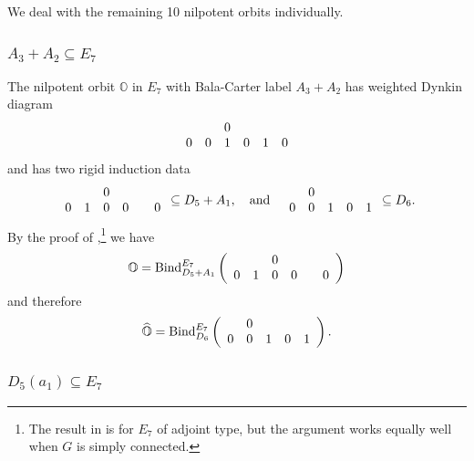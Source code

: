 \documentclass[11pt]{amsart}
\renewcommand{\O}{{\mathbb O}}
\newcommand{\BInd}{{{\mbox{\rm Bind}}}}
\newcommand{\hatO}{\widehat{\O}}
\numberwithin{equation}{section}
\begin{document}
	We deal with the remaining 10 nilpotent orbits individually.
	
	\subsubsection{\texorpdfstring{$A_3+A_2\subseteq E_7$}{A3A2 in E7}}\label{sss: A3A2 in E7}
	
	The nilpotent orbit $\O$ in $E_7$ with Bala-Carter label $A_3+A_2$ has weighted Dynkin diagram
	$$\begin{array}{c c c c c c}
		& & 0 & & & \\
		0 & 0 & 1 & 0 & 1 & 0 \\
	\end{array}$$ and has two rigid induction data $$\begin{array}{c c c c c c}
		& & 0 & & & \\
		0 & 1 & 0 & 0 & & 0  \\
	\end{array}\subseteq D_5+A_1,\quad\mbox{and}\quad \begin{array}{c c c c c}
		& 0 &  & &\\
		0 & 0 & 1 & 0 & 1\\
	\end{array}\subseteq D_6.$$
	By the proof of \cite[Proposition 3.1]{Fu},\footnote{The result in \cite{Fu} is for $E_7$ of adjoint type, but the argument works equally well when $G$ is simply connected.} we have $$\O= \BInd_{D_5+A_1}^{E_7}\left(\begin{array}{c c c c c c}
		& & 0 & & & \\
		0 & 1 & 0 & 0 & & 0  \\
	\end{array}\right)$$ and therefore 
	$$\hatO= \BInd_{D_6}^{E_7}\left(\begin{array}{c c c c c}
		& 0 & & &\\
		0 & 0 &  1 & 0 & 1\\
	\end{array}\right).$$
	
	
	
	\subsubsection{\texorpdfstring{$D_5(a_1)\subseteq E_7$}{D5a1 in E7}}\label{sss: D5a1 in E7}
	
\end{document}
